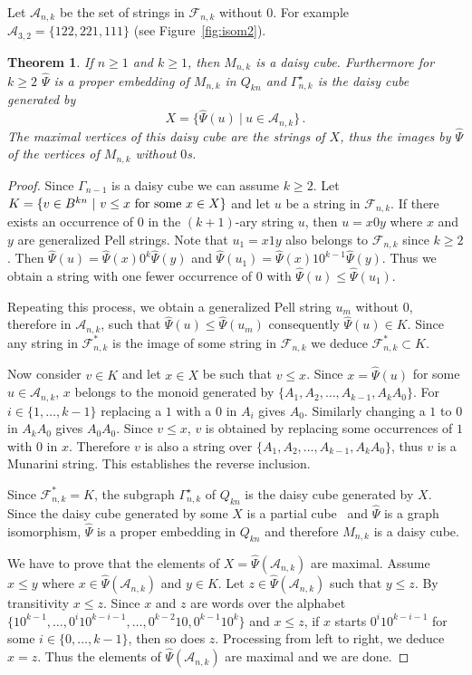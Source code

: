 \documentclass[11pt]{article}
\newtheorem{theorem}{\bf Theorem}[section]
\newcommand{\Fib}{{\mathcal F}}
\newcommand{\A}{{\mathcal A}}
\newcommand{\st}{ ~|~ }
\begin{document}
Let $\A_{n,k}$ be the set of strings in $\Fib_{n,k}$ without $0$. For example $\A_{3,2}=\{122,221,111\}$ (see Figure~\ref{fig:isom2}).

\begin{theorem}
If $n\geq 1$ and $k\geq1$, then $M_{n,k}$ is a daisy cube. Furthermore for $k\geq2$ $\widehat{\Psi}$ is a proper embedding of $M_{n,k}$ in $Q_{kn}$ and $\Gamma_{n,k}^\star$ is the daisy cube generated by  $$X=\{\widehat{\Psi}(u)\st u\in \A_{n,k}\}\,.$$ The maximal vertices of this daisy cube are the strings of $X$, thus the images by $\widehat{\Psi}$ of the vertices of $M_{n,k}$ without $0$s.
\end{theorem}
\begin{proof}
Since $\Gamma_{n-1}$ is a daisy cube we can assume $k\geq2$. Let $K=\{v\in B^{kn}\st v\le x\ {\rm for\ some}\ x\in X \}$ and let $u$ be a string in $\Fib_{n,k}$. If there exists an occurrence 
of $0$ in the $(k+1)$-ary string $u$, then $u=x0y$ where $x$ and $y$ are 
generalized Pell strings.  Note that $u_1=x1y$ also belongs to $\Fib_{n,k}$ since $k\geq2$. 
Then $\widehat{\Psi}(u)=\widehat{\Psi}(x)0^k\widehat{\Psi}(y)$ and $\widehat{\Psi}(u_1)=\widehat{\Psi}(x)10^{k-1}\widehat{\Psi}(y)$. Thus we obtain a string with one fewer occurrence of $0$ with $\widehat{\Psi}(u)\leq\widehat{\Psi}(u_{1})$.

Repeating this process, we obtain a generalized Pell string $u_m$ without $0$, therefore in $\A_{n,k}$, such that 
$\widehat{\Psi}(u)\leq\widehat{\Psi}(u_m)$ consequently $\widehat{\Psi}(u) \in K$.  Since any string in $\Fib_{n,k}^*$ is the image of some string in $\Fib_{n,k}$ we deduce $\Fib_{n,k}^*\subset K$. 

Now consider $v \in K$ and let $x\in X$ be such that  $v\leq x$. Since $x=\widehat{\Psi}(u)$ for some $u\in \A_{n,k}$, $x$ belongs to the monoid generated by $\{A_1,A_2,\ldots,A_{k-1},A_kA_0\}$. For $i\in\{1,\ldots,k-1\}$ replacing a $1$ with a $0$  in $A_i$ gives $A_0$. Similarly changing a $1$ to $0$  in $A_kA_0$ gives $A_0A_0$. Since $v\leq x$, $v$ is obtained by replacing some occurrences of $1$ with $0$ in $x$. Therefore  $v$ is also a
string over $\{A_1,A_2,\ldots,A_{k-1},A_kA_0\}$, thus $v$ is a Munarini string. This establishes the reverse inclusion.
 
Since $\Fib_{n,k}^*=K$, the subgraph $\Gamma_{n,k}^\star$ of $Q_{kn}$ is the daisy cube generated by $X$. Since the daisy cube generated by some $X$ is a partial cube~\cite[Proposition 2.1]{KM-2019a} and $\widehat{\Psi}$ is a graph isomorphism, $\widehat{\Psi}$ is a proper embedding in $Q_{kn}$ and therefore $M_{n,k}$ is a daisy cube.

We have to prove that the elements of $X=\widehat{\Psi}(\A_{n,k})$ are maximal. 
Assume $x\leq y$ where $x \in \widehat{\Psi}(\A_{n,k})$ and $y \in K$. 
Let $z\in \widehat{\Psi}(\A_{n,k})$ such that $y \le z$. By transitivity $x \le z$. 
Since $x$ and $z$ are  words  over the alphabet $\{10^{k-1},\ldots,0^i10^{k-i-1},\ldots,0^{k-2}10,0^{k-1}10^k\}$  and $x\le z$, 
if $x$ starts $0^i10^{k-i-1}$ for some $i\in\{0,\ldots,k-1\}$, then so does $z$. 
Processing from left to right, we deduce $x=z$. 
Thus the elements of  $\widehat{\Psi}(\A_{n,k})$ are maximal and we are done.
\end {proof}
\end{document}

